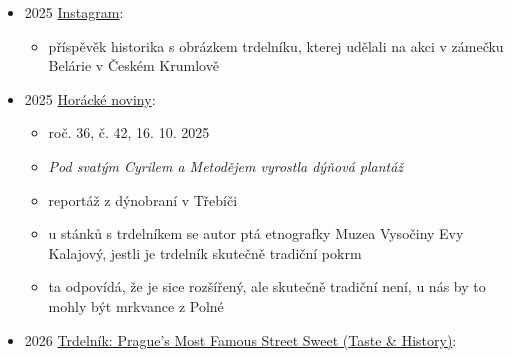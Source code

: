 \begin{itemize}
  \begin{itemize}
  \tightlist
  \item
    akce Kouzelný stůl na zámečku Belárie v Českým Krumově, kterej vedla
    Irena Korbelářová, která vede Filozoficko-přírodovědeckou fakultu v
    Opavě a je spoluautorkou Kulinárního dědictví Českých zemí
  \item
    inspirovali se obrázkem Conrada Haggera z 2. dílu jeho kuchařky z
    roku 1722 (víc o tom píšu v záznamu výš)
  \item
    vytvořili ale v zásadě standardní trdelník z pruhu těsta, Hagger ve
    skutečnosti měl recept na plát těsta s nádivkou
  \item
    \href{https://www.youtube.com/watch?v=nwxBsjIHJbA}{Rozhovor o
    kouzelném stole} - je to stůl, co fungoval jako výtah, když
    potřebovali vyměnit chod, spustili desku dolu a dali tam novou
  \item
    \href{https://www.youtube.com/watch?v=-NAvlXIqYdA&t=2s}{Rozhovor s
    Irenou Korbelářovou} - ukázky vaření v černý kuchyni, kterou na
    zámku zrestaurovali, včetně rožně s automatickým otáčením
  \end{itemize}
\item
  2025
  \href{https://www.instagram.com/ivanpatrickday/p/DPwL2PAjDdK/?hl=en&img_index=1}{Instagram}:

  \begin{itemize}
  \tightlist
  \item
    příspěvěk historika  s obrázkem trdelníku,
    kterej udělali na akci v zámečku Belárie v Českém Krumlově
  \end{itemize}
\item
  2025
  \href{https://www.digitalniknihovna.cz/kkvhb/uuid/uuid:0d70f115-be1f-4625-977d-543228499ca4}{Horácké
  noviny}:

  \begin{itemize}
  \tightlist
  \item
    roč. 36, č. 42, 16. 10. 2025
  \item
    \emph{Pod svatým Cyrilem a Metodějem vyrostla dýňová plantáž}
  \item
    reportáž z dýnobraní v Třebíči
  \item
    u stánků s trdelníkem se autor ptá etnografky Muzea Vysočiny Evy
    Kalajový, jestli je trdelník skutečně tradiční pokrm
  \item
    ta odpovídá, že je sice rozšířený, ale skutečně tradiční není, u nás
    by to mohly být mrkvance z Polné
  \end{itemize}
\item
  2026 \href{https://www.youtube.com/watch?v=c77-4m1jyNw}{Trdelník:
  Prague's Most Famous Street Sweet (Taste \& History)}:


\end{itemize}
